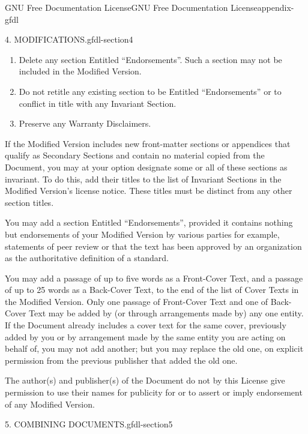 \documentclass[oneside,10pt,]{book}
\numberwithin{equation}{section}
\begin{document}
\begin{appendixptx}{GNU Free Documentation License}{}{GNU Free Documentation License}{}{}{appendix-gfdl}
\begin{paragraphs}{4. MODIFICATIONS.}{gfdl-section4}
\begin{enumerate}[label=\Alph*.]
Preserve all the Invariant Sections of the Document, unaltered in their text and in their titles. Section numbers or the equivalent are not considered part of the section titles.%
\item\hypertarget{li-159}{}\hypertarget{p-1591}{}%
Delete any section Entitled ``Endorsements''. Such a section may not be included in the Modified Version.%
\item\hypertarget{li-160}{}\hypertarget{p-1592}{}%
Do not retitle any existing section to be Entitled ``Endorsements'' or to conflict in title with any Invariant Section.%
\item\hypertarget{li-161}{}\hypertarget{p-1593}{}%
Preserve any Warranty Disclaimers.%
\end{enumerate}
\hypertarget{p-1594}{}%
If the Modified Version includes new front-matter sections or appendices that qualify as Secondary Sections and contain no material copied from the Document, you may at your option designate some or all of these sections as invariant. To do this, add their titles to the list of Invariant Sections in the Modified Version's license notice. These titles must be distinct from any other section titles.%
\par
\hypertarget{p-1595}{}%
You may add a section Entitled ``Endorsements'', provided it contains nothing but endorsements of your Modified Version by various parties \textemdash{} for example, statements of peer review or that the text has been approved by an organization as the authoritative definition of a standard.%
\par
\hypertarget{p-1596}{}%
You may add a passage of up to five words as a Front-Cover Text, and a passage of up to 25 words as a Back-Cover Text, to the end of the list of Cover Texts in the Modified Version. Only one passage of Front-Cover Text and one of Back-Cover Text may be added by (or through arrangements made by) any one entity. If the Document already includes a cover text for the same cover, previously added by you or by arrangement made by the same entity you are acting on behalf of, you may not add another; but you may replace the old one, on explicit permission from the previous publisher that added the old one.%
\par
\hypertarget{p-1597}{}%
The author(s) and publisher(s) of the Document do not by this License give permission to use their names for publicity for or to assert or imply endorsement of any Modified Version.%
\end{paragraphs}%
\begin{paragraphs}{5. COMBINING DOCUMENTS.}{gfdl-section5}%

\end{paragraphs}
\end{appendixptx}
\end{document}
